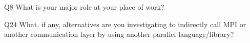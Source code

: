 \begin{description}%
\item{Q8} What is your major role at your place of work?%
\item{Q24} What, if any, alternatives are you investigating to indirectly call MPI or another communication layer by using another parallel language/library?%
\end{description}%
